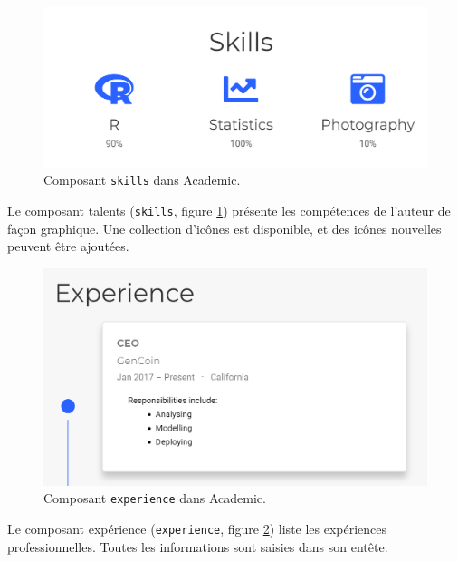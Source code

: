 \documentclass[
  12pt,
  french,
  a4paper,
  extrafontsizes,onecolumn,openright
  ]{memoir}
\begin{document}
\scriptsize

\begin{figure}

{\centering \includegraphics[width=0.8\linewidth]{images/rediger-skills} 

}

\caption{Composant \texttt{skills} dans Academic.}\label{fig:rediger-skills}
\end{figure}

\normalsize

Le composant talents (\texttt{skills}, figure \ref{fig:rediger-skills}) présente les compétences de l'auteur de façon graphique.
Une collection d'icônes est disponible, et des icônes nouvelles peuvent être ajoutées.



\scriptsize

\begin{figure}

{\centering \includegraphics[width=0.8\linewidth]{images/rediger-experience} 

}

\caption{Composant \texttt{experience} dans Academic.}\label{fig:rediger-experience}
\end{figure}

\normalsize

Le composant expérience (\texttt{experience}, figure \ref{fig:rediger-experience}) liste les expériences professionnelles.
Toutes les informations sont saisies dans son entête.
\end{document}
